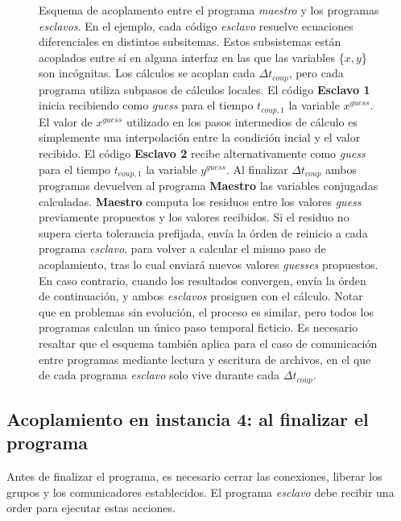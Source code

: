 \begin{figure}
\begin{tikzpicture}
\end{tikzpicture}
\caption[Esquema de acoplamiento entre programas implementado]{Esquema de acoplamento entre el programa \textit{maestro} y los programas \textit{esclavos}.
En el ejemplo, cada código \textit{esclavo} resuelve ecuaciones diferenciales en distintos subsitemas.
Estos subsistemas están acoplados entre sí en alguna interfaz en las que las variables \{$x,y$\} son incógnitas.
Los cálculos se acoplan cada $\Delta t_{coup}$, pero cada programa utiliza subpasos de cálculos locales.
El código \textbf{Esclavo 1} inicia recibiendo como \textit{guess} para el tiempo $t_{coup,1}$ la variable $x^{guess}$.
El valor de $x^{guess}$ utilizado en los pasos intermedios de cálculo es simplemente una interpolación entre la condición incial y el valor recibido.
El código \textbf{Esclavo 2} recibe alternativamente como \textit{guess} para el tiempo $t_{coup,1}$ la variable $y^{guess}$.
Al finalizar $\Delta t_{coup}$ ambos programas devuelven al programa \textbf{Maestro} las variables conjugadas calculadas.
\textbf{Maestro} computa los residuos entre los valores \textit{guess} previamente propuestos y los valores recibidos.
Si el residuo no supera cierta tolerancia prefijada, envía la órden de reinicio a cada programa \textit{esclavo}, 
para volver a calcular el mismo paso de acoplamiento, tras lo cual enviará nuevos valores \textit{guesses} propuestos.
En caso contrario, cuando los resultados convergen, envía la órden de continuación, y ambos \textit{esclavos} prosiguen con el cálculo.
Notar que en problemas sin evolución, el proceso es similar, pero todos los programas calculan un único paso temporal ficticio.
Es necesario resaltar que el esquema también aplica para el caso de comunicación entre programas mediante lectura y escritura de archivos, en el que de cada programa \textit{esclavo} solo vive durante cada $\Delta t_{coup}$.
}
\label{esquema-evolucion}
\end{figure}

\subsection*{Acoplamiento en instancia 4: al finalizar el programa}

Antes de finalizar el programa, es necesario cerrar las conexiones, liberar los grupos y los comunicadores establecidos.
El programa \textit{esclavo} debe recibir una order para ejecutar estas acciones.

\bigskip

